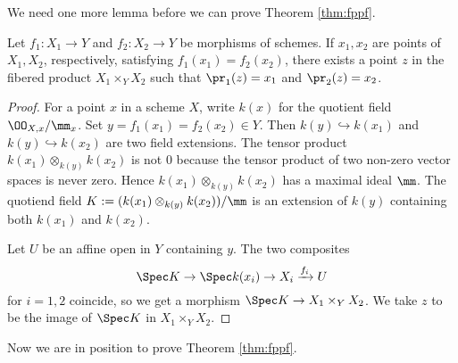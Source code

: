 \documentclass[11pt, english]{article}
\begin{document}
We need one more lemma before we can prove Theorem \ref{thm:fppf}. 
\begin{lemma}
\label{lemma:pointsfiber}
Let $f_1:X_1 \to Y$ and $f_2:X_2 \to Y$ be morphisms of schemes. If $x_1,x_2$ are points of $X_1,X_2$, respectively, satisfying $f_1(x_1)=f_2(x_2)$, there exists a point $z$ in the fibered product $X_1 \times_Y X_2$ such that $\pr_1(z)=x_1$ and $\pr_2(z)=x_2$.
\end{lemma}
\begin{proof}
For a point $x$ in a scheme $X$, write $k(x)$ for the quotient field $\OO_{X,x}/\mm_x$. Set $y=f_1(x_1)=f_2(x_2) \in Y$. Then $k(y) \hookrightarrow k(x_1)$ and $k(y) \hookrightarrow k(x_2)$ are two field extensions. The tensor product $k(x_1) \otimes_{k(y)} k(x_2)$ is not $0$ because the tensor product of two non-zero vector spaces is never zero. Hence $k(x_1) \otimes_{k(y)} k(x_2)$ has a maximal ideal $\mm$. The quotiend field $K := (k(x_1) \otimes_{k(y)} k(x_2))/\mm$ is an extension of $k(y)$ containing both $k(x_1)$ and $k(x_2)$. 

Let $U$ be an affine open in $Y$ containing $y$.  The two composites
\[
\Spec K \to \Spec k(x_i) \to X_i \xrightarrow{f_i} U
\]
for $i=1,2$ coincide, so we get a morphism $\Spec K \to X_1 \times_Y X_2$. We take $z$ to be the image of $\Spec K$ in $X_1 \times_Y X_2$.
\end{proof}

Now we are in position to prove Theorem \ref{thm:fppf}.
\end{document}
